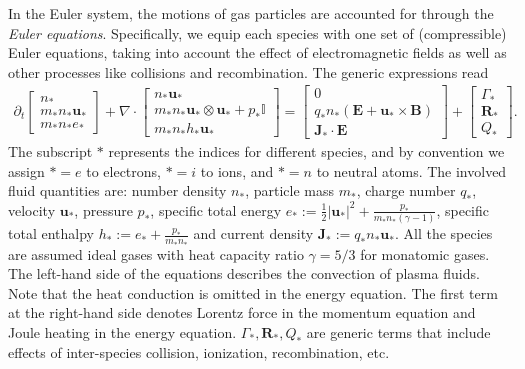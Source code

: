 \documentclass{article}
\begin{document}
In the Euler system, the motions of gas particles are accounted for through the \emph{Euler equations}. Specifically, we equip each species with one set of (compressible) Euler equations, taking into account the effect of electromagnetic fields as well as other processes like collisions and recombination. The generic expressions read
\begin{align} \label{equ:euler_}
    \partial_t
    \begin{bmatrix}
    n_* \\
    m_*n_* \mathbf{u}_* \\
    m_*n_* e_*
    \end{bmatrix}
    + \nabla \cdot
    \begin{bmatrix}
    n_* \mathbf{u}_* \\
    m_*n_* \mathbf{u}_* \otimes \mathbf{u}_* + p_*\mathbb{I} \\
    m_*n_* h_* \mathbf{u}_*
    \end{bmatrix}
    =
    \begin{bmatrix}
    0 \\
    q_*n_*(\mathbf{E} + \mathbf{u}_* \times \mathbf{B}) \\
    \mathbf{J}_* \cdot \mathbf{E}
    \end{bmatrix}
    +
    \begin{bmatrix}
    \Gamma_* \\
    \mathbf{R}_* \\
    Q_*
    \end{bmatrix}.
\end{align}
The subscript $*$ represents the indices for different species, and by convention we assign $* = e$ to electrons, $* = i$ to ions, and $* = n$ to neutral atoms. The involved fluid quantities are: number density $n_*$, particle mass $m_*$,  charge number $q_*$, velocity $\mathbf{u}_*$, pressure $p_*$, specific total energy $e_* := \frac{1}{2}|\mathbf{u}_*|^2 + \frac{p_*}{m_*n_*(\gamma - 1)}$, specific total enthalpy $h_* := e_* + \frac{p_*}{m_*n_*}$ and current density $\mathbf{J}_* := q_*n_*\mathbf{u}_*$. All the species are assumed ideal gases with heat capacity ratio $\gamma=5/3$ for monatomic gases. The left-hand side of the equations describes the convection of plasma fluids. Note that the heat conduction is omitted in the energy equation. The first term at the right-hand side denotes Lorentz force in the momentum equation and Joule heating in the energy equation. $\Gamma_*, \mathbf{R}_*, Q_*$ are generic terms that include effects of inter-species collision, ionization, recombination, etc. 
\end{document}

